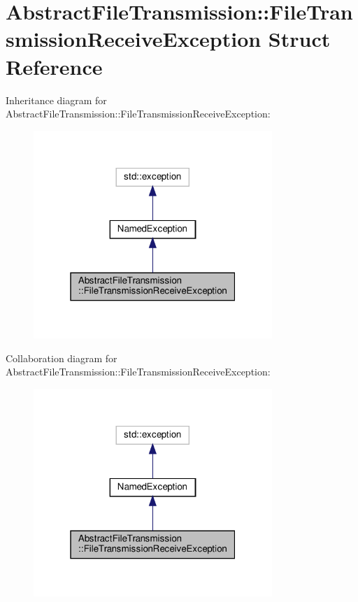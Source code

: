 \hypertarget{structAbstractFileTransmission_1_1FileTransmissionReceiveException}{}\section{Abstract\+File\+Transmission\+:\+:File\+Transmission\+Receive\+Exception Struct Reference}
\label{structAbstractFileTransmission_1_1FileTransmissionReceiveException}


Inheritance diagram for Abstract\+File\+Transmission\+:\+:File\+Transmission\+Receive\+Exception\+:\nopagebreak
\begin{figure}[H]
\begin{center}
\leavevmode
\includegraphics[width=256pt]{d6/d49/structAbstractFileTransmission_1_1FileTransmissionReceiveException__inherit__graph}
\end{center}
\end{figure}


Collaboration diagram for Abstract\+File\+Transmission\+:\+:File\+Transmission\+Receive\+Exception\+:\nopagebreak
\begin{figure}[H]
\begin{center}
\leavevmode
\includegraphics[width=256pt]{d6/d54/structAbstractFileTransmission_1_1FileTransmissionReceiveException__coll__graph}
\end{center}
\end{figure}
